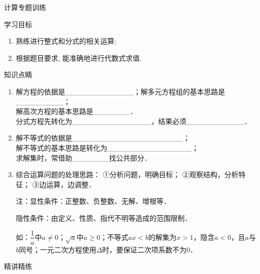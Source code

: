 \documentclass[10pt,twoside,fleqn]{ctexart}
\renewcommand*{\ge}{\geqslant}
\begin{document}
\begin{center}
{\kaishu{}计算专题训练}
\end{center}


{\heiti 学习目标}
\begin{enumerate}
\item
熟练进行整式和分式的相关运算;

\item
根据题目要求, 能准确地进行代数式求值.
\end{enumerate}

{\heiti 知识点睛}

\begin{enumerate}




\item 解方程的依据是{\_}{\_}{\_}{\_}{\_}{\_}{\_}{\_}{\_}{\_}{\_}{\_}{\_}；解多元方程组的基本思路是{\_}{\_}{\_}{\_}{\_}{\_}{\_}{\_}{\_}；\\
解高次方程的基本思路是{\_}{\_}{\_}{\_}{\_}{\_}{\_}．\\
分式方程先转化为{\_}{\_}{\_}{\_}{\_}{\_}{\_}{\_}{\_}{\_}{\_}{\_}{\_}{\_}{\_}，结果必须{\_}{\_}{\_}{\_}{\_}{\_}{\_}{\_}{\_}{\_}{\_}．
\item 解不等式的依据是{\_}{\_}{\_}{\_}{\_}{\_}{\_}{\_}{\_}{\_}{\_}{\_}{\_}{\_}{\_}{\_}{\_}{\_}{\_}{\_}{\_}；\\
解不等式的基本思路是转化为{\_}{\_}{\_}{\_}{\_}{\_}{\_}{\_}{\_}{\_}{\_}{\_}{\_}{\_}{\_}{\_}；\\
求解集时，常借助{\_}{\_}{\_}{\_}{\_}{\_}{\_}找公共部分．
\item 综合运算问题的处理思路：
①分析问题，明确目标；
②观察结构，分析特征；
③边运算，边调整．

注：显性条件：正整数、负整数、无解、增根等．

隐性条件：由定义、性质、指代不明等造成的范围限制．

如：$\dfrac{1}{a}$中$a\ne $0；$\sqrt a $中$a\ge $0；不等式$ax<b$的解集为$x>1$，隐含$a<0$，且$a$与$b$同号；一元二次方程使用$\Delta $时，要保证二次项系数不为0．
\end{enumerate}

{\heiti 精讲精练}
\end{document}
